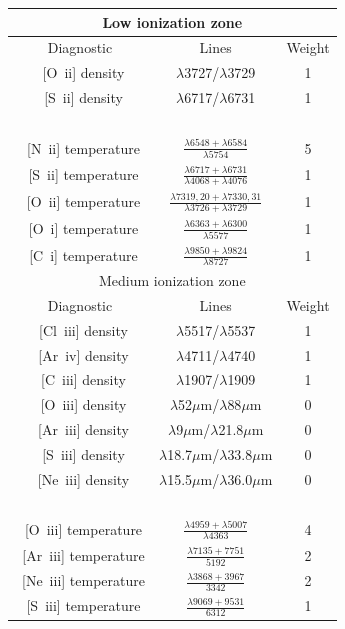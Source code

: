 \documentclass[useAMS,usenatbib]{mn2e}
\begin{document}
\begin{table}
\begin{tabular}{ccc}
\hline
\multicolumn{3}{c}{Low ionization zone}\\
\hline
Diagnostic & Lines & Weight \\
~[O~{\sc ii}] density & $\lambda$3727/$\lambda$3729 & 1 \\
~[S~{\sc ii}] density & $\lambda$6717/$\lambda$6731 & 1 \\
~\\
~[N~{\sc ii}] temperature & $\frac{\lambda 6548 + \lambda 6584}{\lambda 5754}$ & 5 \\
~[S~{\sc ii}] temperature & $\frac{\lambda 6717 + \lambda 6731}{\lambda 4068 +  \lambda 4076}$ & 1 \\
~[O~{\sc ii}] temperature & $\frac{\lambda 7319,20 + \lambda 7330,31}{\lambda 3726 + \lambda 3729}$ & 1 \\
~[O~{\sc i}] temperature & $\frac{\lambda 6363 + \lambda 6300}{\lambda 5577}$ & 1 \\
~[C~{\sc i}] temperature & $\frac{\lambda 9850 + \lambda 9824}{\lambda 8727}$ & 1 \\
\hline
\multicolumn{3}{c}{Medium ionization zone}\\
\hline
Diagnostic & Lines & Weight \\
~[Cl~{\sc iii}] density & $\lambda$5517/$\lambda$5537 & 1 \\
~[Ar~{\sc iv}] density & $\lambda$4711/$\lambda$4740 & 1 \\
~[C~{\sc iii}] density & $\lambda$1907/$\lambda$1909 & 1 \\
~[O~{\sc iii}] density & $\lambda$52$\mu$m/$\lambda$88$\mu$m & 0 \\
~[Ar~{\sc iii}] density & $\lambda$9$\mu$m/$\lambda$21.8$\mu$m & 0 \\
~[S~{\sc iii}] density & $\lambda$18.7$\mu$m/$\lambda$33.8$\mu$m & 0 \\
~[Ne~{\sc iii}] density & $\lambda$15.5$\mu$m/$\lambda$36.0$\mu$m & 0 \\
~\\
~[O~{\sc iii}] temperature & $\frac{\lambda 4959 + \lambda 5007}{\lambda 4363}$ & 4\\
~[Ar~{\sc iii}] temperature & $\frac{\lambda 7135 + 7751}{5192}$ & 2\\
~[Ne~{\sc iii}] temperature & $\frac{\lambda 3868 + 3967}{3342}$ & 2\\
~[S~{\sc iii}] temperature & $\frac{\lambda 9069 + 9531}{6312}$ & 1\\

\end{tabular}
\end{table}
\end{document}
